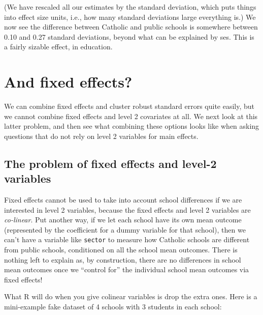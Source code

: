 \documentclass[
  letterpaper,
  DIV=11,
  numbers=noendperiod]{scrreprt}
\begin{document}
(We have rescaled all our estimates by the standard deviation, which
puts things into effect size units, i.e., how many standard deviations
large everything is.) We now see the difference between Catholic and
public schools is somewhere between 0.10 and 0.27 standard deviations,
beyond what can be explained by ses. This is a fairly sizable effect, in
education.

\section{And fixed effects?}\label{and-fixed-effects}

We can combine fixed effects and cluster robust standard errors quite
easily, but we cannot combine fixed effects and level 2 covariates at
all. We next look at this latter problem, and then see what combining
these options looks like when asking questions that do not rely on level
2 variables for main effects.

\subsection{The problem of fixed effects and level-2
variables}\label{the-problem-of-fixed-effects-and-level-2-variables}

Fixed effects cannot be used to take into account school differences if
we are interested in level 2 variables, because the fixed effects and
level 2 variables are \emph{co-linear}. Put another way, if we let each
school have its own mean outcome (represented by the coefficient for a
dummy variable for that school), then we can't have a variable like
\texttt{sector} to measure how Catholic schools are different from
public schools, conditioned on all the school mean outcomes. There is
nothing left to explain as, by construction, there are no differences in
school mean outcomes once we ``control for'' the individual school mean
outcomes via fixed effects!

What R will do when you give colinear variables is drop the extra ones.
Here is a mini-example fake dataset of 4 schools with 3 students in each
school:
\end{document}
